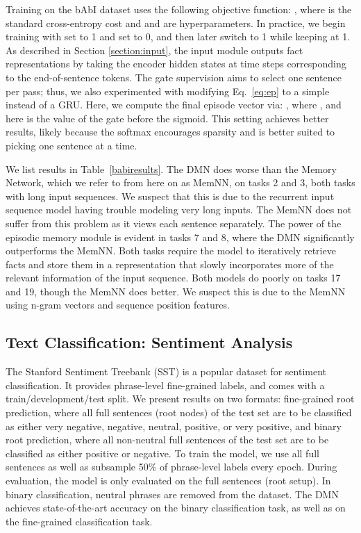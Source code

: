 \documentclass{article}
\begin{document}
Training on the bAbI dataset uses the following objective function: , where  is the standard cross-entropy cost and  and  are hyperparameters. In practice, we begin training with  set to 1 and  set to 0, and then later switch  to 1 while keeping  at 1. As described in Section \ref{section:input}, the input module outputs fact representations by taking the encoder hidden states at time steps corresponding to the end-of-sentence tokens. The gate supervision aims to select one sentence per pass; thus, we also experimented with modifying Eq.~\ref{eq:ep} to a simple  instead of a GRU. Here, we compute the final episode vector via:
, 
where , and  here is the value of the gate before the sigmoid. This setting achieves better results, likely because the softmax encourages sparsity and is better suited to picking one sentence at a time.


We list results in Table~\ref{babiresults}. The DMN does worse than the Memory Network, which we refer to from here on as MemNN, on tasks 2 and 3, both tasks with long input sequences.  
We suspect that this is due to the recurrent input sequence model having trouble modeling very long inputs. The MemNN does not suffer from this problem as it views each sentence separately. 
The power of the episodic memory module is evident in tasks 7 and 8, where the DMN significantly outperforms the MemNN. Both tasks require the model to iteratively retrieve facts and store them in a representation that slowly incorporates more of the relevant information of the input sequence. 
Both models do poorly on tasks 17 and 19, though the MemNN does better. We suspect this is due to the MemNN using n-gram vectors and sequence position features.

\subsection{Text Classification: Sentiment Analysis}
The Stanford Sentiment Treebank (SST) \cite{Socher2013EMNLP} is a popular dataset for sentiment classification. It provides phrase-level fine-grained labels, and comes with a train/development/test split. We present results on two formats: fine-grained root prediction, where all full sentences (root nodes) of the test set are to be classified as either very negative, negative, neutral, positive, or very positive, and binary root prediction, where all non-neutral full sentences of the test set are to be classified as either positive or negative.
To train the model, we use all full sentences as well as subsample 50\% of phrase-level labels every epoch. During evaluation, the model is only evaluated on the full sentences (root setup). In binary classification, neutral phrases are removed from the dataset. The DMN achieves state-of-the-art accuracy on the binary classification task, as well as on the fine-grained classification task.
\end{document}
